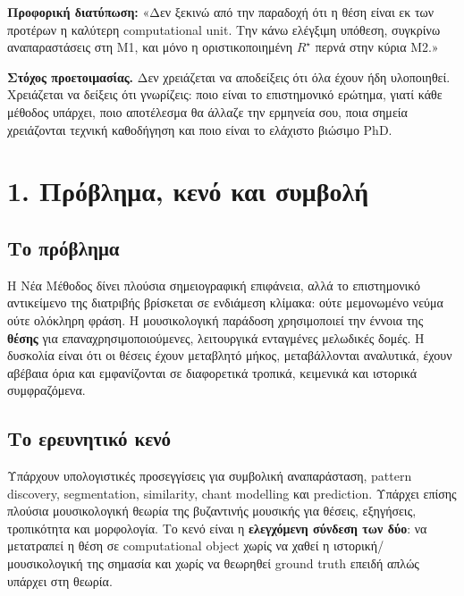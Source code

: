 \documentclass[9pt,a4paper]{extarticle}
\newcommand{\say}[1]{\begin{keybox}\textbf{Προφορική διατύπωση:} #1\end{keybox}}
\begin{document}
\say{«Δεν ξεκινώ από την παραδοχή ότι η θέση είναι εκ των προτέρων η καλύτερη computational unit. Την κάνω ελέγξιμη υπόθεση, συγκρίνω αναπαραστάσεις στη M1, και μόνο η οριστικοποιημένη \(R^\star\) περνά στην κύρια M2.»}

\begin{warnbox}
\textbf{Στόχος προετοιμασίας.} Δεν χρειάζεται να αποδείξεις ότι όλα έχουν ήδη υλοποιηθεί. Χρειάζεται να δείξεις ότι γνωρίζεις: ποιο είναι το επιστημονικό ερώτημα, γιατί κάθε μέθοδος υπάρχει, ποιο αποτέλεσμα θα άλλαζε την ερμηνεία σου, ποια σημεία χρειάζονται τεχνική καθοδήγηση και ποιο είναι το ελάχιστο βιώσιμο PhD.
\end{warnbox}

\newpage
\section*{1. Πρόβλημα, κενό και συμβολή}

\subsection*{Το πρόβλημα}
Η Νέα Μέθοδος δίνει πλούσια σημειογραφική επιφάνεια, αλλά το επιστημονικό αντικείμενο της διατριβής βρίσκεται σε ενδιάμεση κλίμακα: ούτε μεμονωμένο νεύμα ούτε ολόκληρη φράση. Η μουσικολογική παράδοση χρησιμοποιεί την έννοια της \textbf{θέσης} για επαναχρησιμοποιούμενες, λειτουργικά ενταγμένες μελωδικές δομές. Η δυσκολία είναι ότι οι θέσεις έχουν μεταβλητό μήκος, μεταβάλλονται αναλυτικά, έχουν αβέβαια όρια και εμφανίζονται σε διαφορετικά τροπικά, κειμενικά και ιστορικά συμφραζόμενα.

\subsection*{Το ερευνητικό κενό}
Υπάρχουν υπολογιστικές προσεγγίσεις για συμβολική αναπαράσταση, pattern discovery, segmentation, similarity, chant modelling και prediction. Υπάρχει επίσης πλούσια μουσικολογική θεωρία της βυζαντινής μουσικής για θέσεις, εξηγήσεις, τροπικότητα και μορφολογία. Το κενό είναι η \textbf{ελεγχόμενη σύνδεση των δύο}: να μετατραπεί η θέση σε computational object χωρίς να χαθεί η ιστορική/μουσικολογική της σημασία και χωρίς να θεωρηθεί ground truth επειδή απλώς υπάρχει στη θεωρία.
\end{document}
